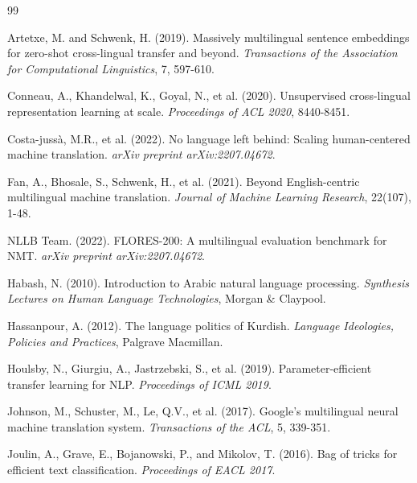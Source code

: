 \documentclass[11pt,twocolumn]{article}
\begin{document}

\begin{thebibliography}{99}

Artetxe, M. and Schwenk, H. (2019).
Massively multilingual sentence embeddings for zero-shot cross-lingual transfer and beyond.
\textit{Transactions of the Association for Computational Linguistics}, 7, 597-610.

Conneau, A., Khandelwal, K., Goyal, N., et al. (2020).
Unsupervised cross-lingual representation learning at scale.
\textit{Proceedings of ACL 2020}, 8440-8451.

Costa-juss\`{a}, M.R., et al. (2022).
No language left behind: Scaling human-centered machine translation.
\textit{arXiv preprint arXiv:2207.04672}.

Fan, A., Bhosale, S., Schwenk, H., et al. (2021).
Beyond English-centric multilingual machine translation.
\textit{Journal of Machine Learning Research}, 22(107), 1-48.

NLLB Team. (2022).
FLORES-200: A multilingual evaluation benchmark for NMT.
\textit{arXiv preprint arXiv:2207.04672}.

Habash, N. (2010).
Introduction to Arabic natural language processing.
\textit{Synthesis Lectures on Human Language Technologies}, Morgan \& Claypool.

Hassanpour, A. (2012).
The language politics of Kurdish.
\textit{Language Ideologies, Policies and Practices}, Palgrave Macmillan.

Houlsby, N., Giurgiu, A., Jastrzebski, S., et al. (2019).
Parameter-efficient transfer learning for NLP.
\textit{Proceedings of ICML 2019}.

Johnson, M., Schuster, M., Le, Q.V., et al. (2017).
Google's multilingual neural machine translation system.
\textit{Transactions of the ACL}, 5, 339-351.

Joulin, A., Grave, E., Bojanowski, P., and Mikolov, T. (2016).
Bag of tricks for efficient text classification.
\textit{Proceedings of EACL 2017}.


\end{thebibliography}
\end{document}
